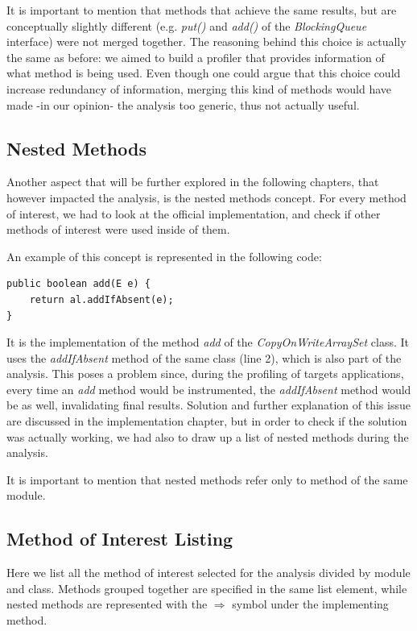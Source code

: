 \documentclass[]{usiinfthesis}
\begin{document}
 \noindent
 It is important to mention that methods that achieve the same results, but are conceptually slightly different (e.g. \textit{put()} and \textit{add()} of the \textit{BlockingQueue} interface) were not merged together. The reasoning behind this choice is actually the same as before: we aimed to build a profiler that provides information of what method is being used. Even though one could argue that this choice could increase redundancy of information, merging this kind of methods would have made -in our opinion- the analysis too generic, thus not actually useful.
 
 \subsection{Nested Methods}
 Another aspect that will be further explored in the following chapters, that however impacted the analysis, is the nested methods concept. For every method of interest, we had to look at the official implementation, and check if other methods of interest were used inside of them.
 
 \noindent
 An example of this concept is represented in the following code:
 
\begin{verbatim}
public boolean add(E e) {
    return al.addIfAbsent(e);
}
\end{verbatim}

\noindent
 It is the implementation of the method \textit{add} of the \textit{CopyOnWriteArraySet} class. It uses the \textit{addIfAbsent} method of the same class (line 2), which is also part of the analysis. This poses a problem since, during the profiling of targets applications, every time an \textit{add} method would be instrumented, the \textit{addIfAbsent} method would be as well, invalidating final results. Solution and further explanation of this issue are discussed in the implementation chapter, but in order to check if the solution was actually working, we had also to draw up a list of nested methods during the analysis.
 
 \noindent
 It is important to mention that nested methods refer only to method of the same module.
 
 \subsection{Method of Interest Listing}
 Here we list all the method of interest selected for the analysis divided by module and class. Methods grouped together are specified in the same list element, while nested methods are represented with the $\Rightarrow$ symbol under the implementing method.
 
\end{document}
